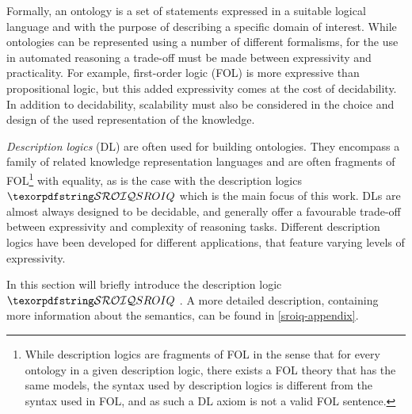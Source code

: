 Formally, an ontology is a set of statements expressed in a suitable logical language and with the purpose of describing a specific domain of interest. While ontologies can be represented using a number of different formalisms, for the use in automated reasoning a trade-off must be made between expressivity and practicality. For example, first-order logic (FOL) is more expressive than propositional logic, but this added expressivity comes at the cost of decidability. In addition to decidability, scalability must also be considered in the choice and design of the used representation of the knowledge.

\emph{Description logics} (DL) are often used for building ontologies. They encompass a family of related knowledge representation languages and are often fragments of FOL\footnote{While description logics are fragments of FOL in the sense that for every ontology in a given description logic, there exists a FOL theory that has the same models, the syntax used by description logics is different from the syntax used in FOL, and as such a DL axiom is not a valid FOL sentence.} with equality, as is the case with the description logics $\SROIQ$ which is the main focus of this work. DLs are almost always designed to be decidable, and generally offer a favourable trade-off between expressivity and complexity of reasoning tasks. Different description logics have been developed for different applications, that feature varying levels of expressivity.

In this section will briefly introduce the description logic $\SROIQ$ \cite{horrocks2006even, rudolph2011foundations, baader_horrocks_lutz_sattler_2017}. A more detailed description, containing more information about the semantics, can be found in \cref{sroiq-appendix}.

